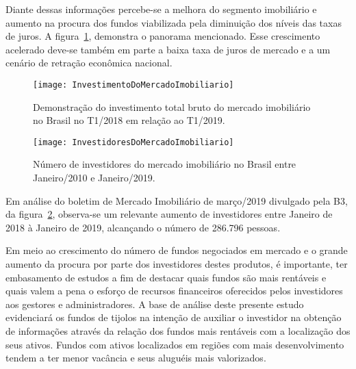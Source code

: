 Diante dessas informações percebe-se a melhora do segmento imobiliário e aumento na procura dos fundos viabilizada pela diminuição dos níveis das taxas de juros. A figura~\ref{fig:real_estate_investment}, demonstra o panorama mencionado. Esse crescimento acelerado deve-se também em parte a baixa taxa de juros de mercado e a um cenário de retração econômica nacional. 

\begin{center}
\begin{figure}
\begin{centering}
\texttt{[image: InvestimentoDoMercadoImobiliario]}
\end{centering}
\caption{\label{fig:real_estate_investment}Demonstração do investimento total bruto do mercado imobiliário no Brasil no T1/2018 em relação ao T1/2019.}
\end{figure}
\vspace*{-44pt}
\end{center}

\begin{center}
\begin{figure}
\begin{centering}
\texttt{[image: InvestidoresDoMercadoImobiliario]}
\end{centering}
\caption{\label{fig:real_estate_investors}Número de investidores do mercado imobiliário no Brasil entre Janeiro/2010 e Janeiro/2019.}
\end{figure}
\vspace*{-44pt}
\end{center}

Em análise do boletim de Mercado Imobiliário de março/2019 divulgado pela B3, da figura~\ref{fig:real_estate_investors}, observa-se um relevante aumento de investidores entre Janeiro de 2018 à Janeiro de 2019, alcançando o número de 286.796 pessoas. 

Em meio ao crescimento do número de fundos negociados em mercado e o grande aumento da procura por parte dos investidores destes produtos, é importante, ter embasamento de estudos a fim de destacar quais fundos são mais rentáveis e quais valem a pena o esforço de recursos financeiros oferecidos pelos investidores aos gestores e administradores. 
A base de análise deste presente estudo evidenciará os fundos de tijolos na intenção de auxiliar o investidor na obtenção de informações através da relação dos fundos mais rentáveis com a localização dos seus ativos.
Fundos com ativos localizados em regiões com mais desenvolvimento tendem a ter menor vacância e seus aluguéis mais valorizados.

